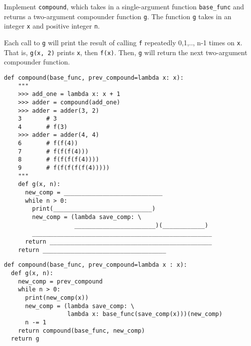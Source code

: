 
\begin{blocksection}
\question Implement \texttt{compound}, which takes in a single-argument function \texttt{base\_func} and returns a two-argument compounder function \texttt{g}. The function \texttt{g} takes in an integer \texttt{x} and positive integer \texttt{n}.

Each call to \texttt{g} will print the result of calling \texttt{f} repeatedly 0,1,.., n-1 times on \texttt{x}. That is, \texttt{g(x, 2)} prints \texttt{x}, then \texttt{f(x)}. Then, \texttt{g} will return the next two-argument compounder function.

\begin{lstlisting}
def compound(base_func, prev_compound=lambda x: x):
    """
    >>> add_one = lambda x: x + 1
    >>> adder = compound(add_one)
    >>> adder = adder(3, 2)
    3       # 3
    4       # f(3)
    >>> adder = adder(4, 4)
    6       # f(f(4))
    7       # f(f(f(4)))
    8       # f(f(f(f(4))))
    9       # f(f(f(f(f(4)))))
    """
    def g(x, n):
      new_comp = ____________________________
      while n > 0:
        print(____________________________)
        new_comp = (lambda save_comp: \
                    _______________________)(____________)
        ___________________________________________________
      return ______________________________________________
    return ___________________________________  
\end{lstlisting}

\begin{solution}[1in]
\begin{lstlisting}
def compound(base_func, prev_compound=lambda x : x):
  def g(x, n):
    new_comp = prev_compound
    while n > 0:
      print(new_comp(x))
      new_comp = (lambda save_comp: \
                  lambda x: base_func(save_comp(x)))(new_comp)
      n -= 1
    return compound(base_func, new_comp)
  return g
\end{lstlisting}
\end{solution}
\end{blocksection}